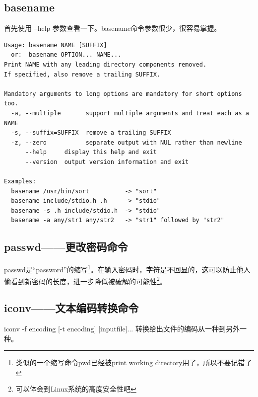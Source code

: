 \subsection{basename}
首先使用 --help 参数查看一下。basename命令参数很少，很容易掌握。
\begin{verbatim}
Usage: basename NAME [SUFFIX]
  or:  basename OPTION... NAME...
Print NAME with any leading directory components removed.
If specified, also remove a trailing SUFFIX.

Mandatory arguments to long options are mandatory for short options too.
  -a, --multiple       support multiple arguments and treat each as a NAME
  -s, --suffix=SUFFIX  remove a trailing SUFFIX
  -z, --zero           separate output with NUL rather than newline
      --help     display this help and exit
      --version  output version information and exit

Examples:
  basename /usr/bin/sort          -> "sort"
  basename include/stdio.h .h     -> "stdio"
  basename -s .h include/stdio.h  -> "stdio"
  basename -a any/str1 any/str2   -> "str1" followed by "str2"
\end{verbatim}




\subsection{passwd——更改密码命令}
passwd是“password”的缩写\footnote{类似的一个缩写命令pwd已经被print working directory用了，所以不要记错了}。在输入密码时，字符是不回显的，这可以防止他人偷看到新密码的长度，进一步降低被破解的可能性\footnote{可以体会到Linux系统的高度安全性吧}。


\subsection{iconv——文本编码转换命令}
iconv -f encoding [-t encoding] [inputfile]... 转换给出文件的编码从一种到另外一种。

